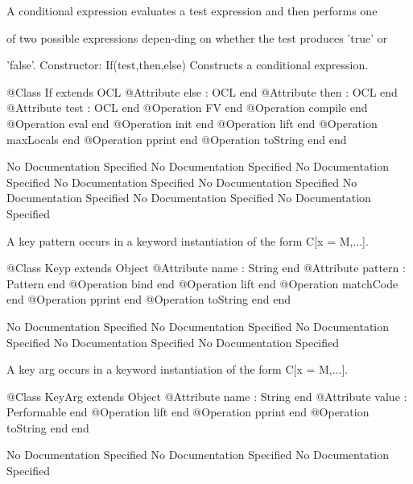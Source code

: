       A conditional expression evaluates a test expression and then performs one

      of two possible expressions depen-ding on whether the test produces 'true' or

      'false'.
      Constructor: If(test,then,else)
        Constructs a conditional expression.
\begin{Interface}
@Class If extends OCL
  @Attribute else : OCL end
  @Attribute then : OCL end
  @Attribute test : OCL end
  @Operation FV end
  @Operation compile end
  @Operation eval end
  @Operation init end
  @Operation lift end
  @Operation maxLocals end
  @Operation pprint end
  @Operation toString end
end
\end{Interface}
No Documentation Specified
No Documentation Specified
No Documentation Specified
No Documentation Specified
No Documentation Specified
No Documentation Specified
No Documentation Specified
No Documentation Specified

      A key pattern occurs in a keyword instantiation of the form C[x = M,...].
\begin{Interface}
@Class Keyp extends Object
  @Attribute name : String end
  @Attribute pattern : Pattern end
  @Operation bind end
  @Operation lift end
  @Operation matchCode end
  @Operation pprint end
  @Operation toString end
end
\end{Interface}
No Documentation Specified
No Documentation Specified
No Documentation Specified
No Documentation Specified
No Documentation Specified

      A key arg occurs in a keyword instantiation of the form C[x = M,...].
\begin{Interface}
@Class KeyArg extends Object
  @Attribute name : String end
  @Attribute value : Performable end
  @Operation lift end
  @Operation pprint end
  @Operation toString end
end
\end{Interface}
No Documentation Specified
No Documentation Specified
No Documentation Specified

